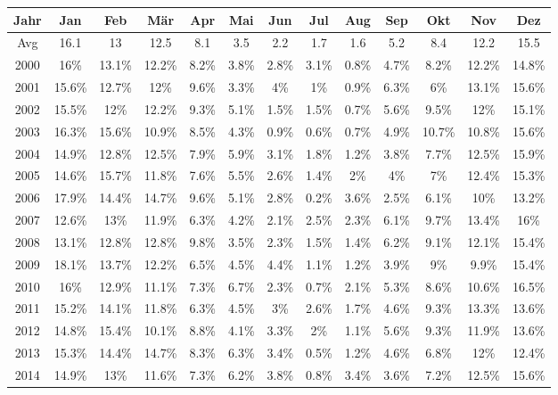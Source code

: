 \documentclass[12pt,a4paper]{article}
\begin{document}
\begin{table}[h]\scriptsize \centering
\begin{tabular}[h]{c|c|c|c|c|c|c|c|c|c|c|c|c}
Jahr & Jan & Feb & Mär & Apr & Mai & Jun & Jul & Aug & Sep & Okt & Nov & Dez \\
\hline
Avg & 16.1 & 13 & 12.5 & 8.1 & 3.5 & 2.2 & 1.7 & 1.6 & 5.2 & 8.4 & 12.2 & 15.5 \\
\hline
2000 & 16\% & 13.1\% & 12.2\% & 8.2\% & 3.8\% & 2.8\% & 3.1\% & 0.8\% & 4.7\% & 8.2\% & 12.2\% & 14.8\% \\
2001 & 15.6\% & 12.7\% & 12\% & 9.6\% & 3.3\% & 4\% & 1\% & 0.9\% & 6.3\% & 6\% & 13.1\% & 15.6\% \\
2002 & 15.5\% & 12\% & 12.2\% & 9.3\% & 5.1\% & 1.5\% & 1.5\% & 0.7\% & 5.6\% & 9.5\% & 12\% & 15.1\% \\
2003 & 16.3\% & 15.6\% & 10.9\% & 8.5\% & 4.3\% & 0.9\% & 0.6\% & 0.7\% & 4.9\% & 10.7\% & 10.8\% & 15.6\% \\
2004 & 14.9\% & 12.8\% & 12.5\% & 7.9\% & 5.9\% & 3.1\% & 1.8\% & 1.2\% & 3.8\% & 7.7\% & 12.5\% & 15.9\% \\
2005 & 14.6\% & 15.7\% & 11.8\% & 7.6\% & 5.5\% & 2.6\% & 1.4\% & 2\% & 4\% & 7\% & 12.4\% & 15.3\% \\
2006 & 17.9\% & 14.4\% & 14.7\% & 9.6\% & 5.1\% & 2.8\% & 0.2\% & 3.6\% & 2.5\% & 6.1\% & 10\% & 13.2\% \\
2007 & 12.6\% & 13\% & 11.9\% & 6.3\% & 4.2\% & 2.1\% & 2.5\% & 2.3\% & 6.1\% & 9.7\% & 13.4\% & 16\% \\
2008 & 13.1\% & 12.8\% & 12.8\% & 9.8\% & 3.5\% & 2.3\% & 1.5\% & 1.4\% & 6.2\% & 9.1\% & 12.1\% & 15.4\% \\
2009 & 18.1\% & 13.7\% & 12.2\% & 6.5\% & 4.5\% & 4.4\% & 1.1\% & 1.2\% & 3.9\% & 9\% & 9.9\% & 15.4\% \\
2010 & 16\% & 12.9\% & 11.1\% & 7.3\% & 6.7\% & 2.3\% & 0.7\% & 2.1\% & 5.3\% & 8.6\% & 10.6\% & 16.5\% \\
2011 & 15.2\% & 14.1\% & 11.8\% & 6.3\% & 4.5\% & 3\% & 2.6\% & 1.7\% & 4.6\% & 9.3\% & 13.3\% & 13.6\% \\
2012 & 14.8\% & 15.4\% & 10.1\% & 8.8\% & 4.1\% & 3.3\% & 2\% & 1.1\% & 5.6\% & 9.3\% & 11.9\% & 13.6\% \\
2013 & 15.3\% & 14.4\% & 14.7\% & 8.3\% & 6.3\% & 3.4\% & 0.5\% & 1.2\% & 4.6\% & 6.8\% & 12\% & 12.4\% \\
2014 & 14.9\% & 13\% & 11.6\% & 7.3\% & 6.2\% & 3.8\% & 0.8\% & 3.4\% & 3.6\% & 7.2\% & 12.5\% & 15.6\% \\

\end{tabular}
\end{table}
\end{document}
